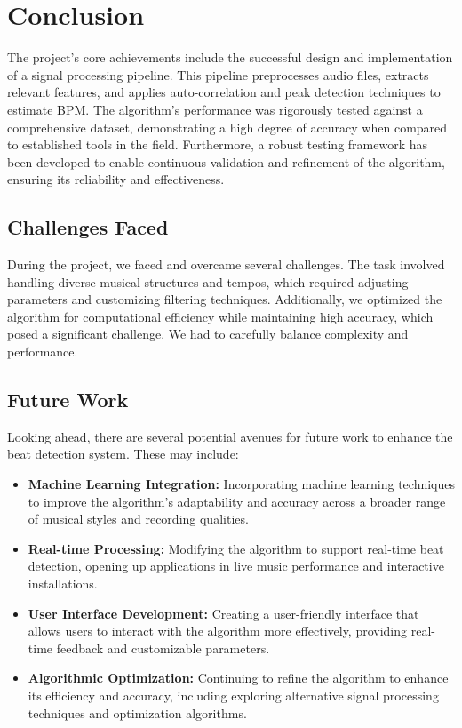\section{Conclusion}

The project's core achievements include the successful design and implementation of a signal processing pipeline. This pipeline preprocesses audio files, extracts relevant features, and applies auto-correlation and peak detection techniques to estimate BPM. The algorithm's performance was rigorously tested against a comprehensive dataset, demonstrating a high degree of accuracy when compared to established tools in the field. Furthermore, a robust testing framework has been developed to enable continuous validation and refinement of the algorithm, ensuring its reliability and effectiveness.

\subsection{Challenges Faced}

During the project, we faced and overcame several challenges. The task involved handling diverse musical structures and tempos, which required adjusting parameters and customizing filtering techniques. Additionally, we optimized the algorithm for computational efficiency while maintaining high accuracy, which posed a significant challenge. We had to carefully balance complexity and performance.

\subsection{Future Work}

Looking ahead, there are several potential avenues for future work to enhance the beat detection system. These may include:

\begin{itemize}
    \item \textbf{Machine Learning Integration:} Incorporating machine learning techniques to improve the algorithm's adaptability and accuracy across a broader range of musical styles and recording qualities.
    \item \textbf{Real-time Processing:} Modifying the algorithm to support real-time beat detection, opening up applications in live music performance and interactive installations.
    \item \textbf{User Interface Development:} Creating a user-friendly interface that allows users to interact with the algorithm more effectively, providing real-time feedback and customizable parameters.
    \item \textbf{Algorithmic Optimization:} Continuing to refine the algorithm to enhance its efficiency and accuracy, including exploring alternative signal processing techniques and optimization algorithms.
\end{itemize}


